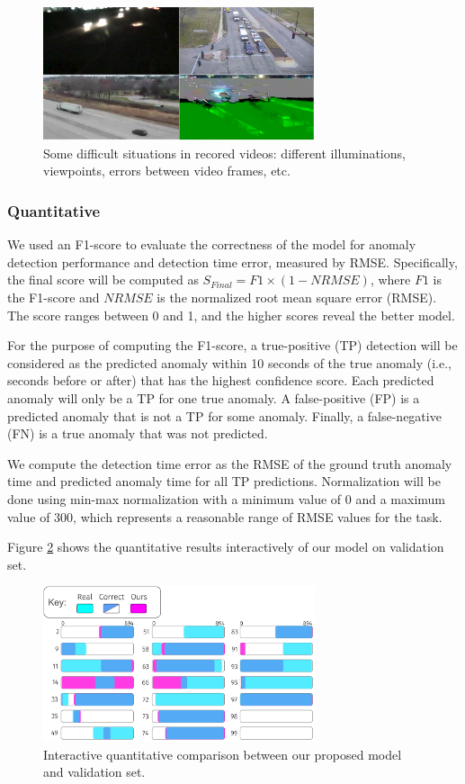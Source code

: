 \documentclass[10pt,twocolumn,letterpaper]{article}
\begin{document}
\begin{figure}  
    \includegraphics[width=8cm]{images/dif1.png}
    \caption{Some difficult situations in recored videos: different illuminations, viewpoints, errors between video frames, etc.}
    \label{diff_sis}
	\end{figure}

\subsubsection{Quantitative}
We used an F1-score to evaluate the correctness of the model for anomaly detection performance and detection time error, measured by RMSE. Specifically, the final score will be computed as $S_{Final}=F1 \times (1-NRMSE)$, where $F1$ is the F1-score and $NRMSE$ is the normalized root mean square error (RMSE). The score ranges between 0 and 1, and the higher scores reveal the better model.

For the purpose of computing the F1-score, a true-positive (TP) detection will be considered as the predicted anomaly within 10 seconds of the true anomaly (i.e., seconds before or after) that has the highest confidence score. Each predicted anomaly will only be a TP for one true anomaly. A false-positive (FP) is a predicted anomaly that is not a TP for some anomaly. Finally, a false-negative (FN) is a true anomaly that was not predicted.

We compute the detection time error as the RMSE of the ground truth anomaly time and predicted anomaly time for all TP predictions. Normalization will be done using min-max normalization with a minimum value of 0 and a maximum value of 300, which represents a reasonable range of RMSE values for the task. 

Figure \ref{res_quan} shows the quantitative results interactively of our model on validation set. 	
\begin{figure}  
    \includegraphics[width=8cm]{images/compare.png}
    \caption{Interactive quantitative comparison between our proposed model and validation set.}
    \label{res_quan}
	\end{figure}
	
\end{document}
